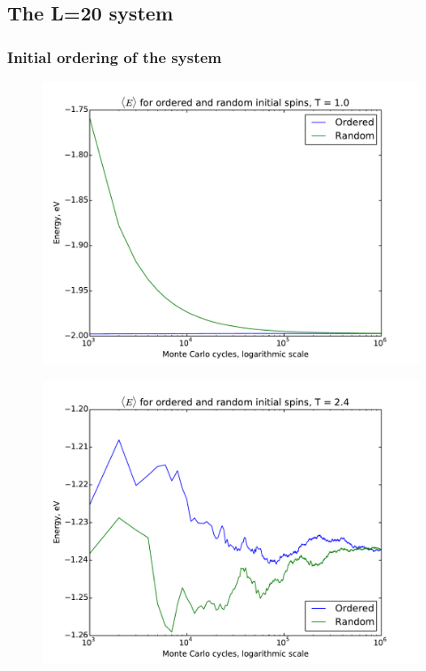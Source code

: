 \subsection{The L=20 system}

\subsubsection{Initial ordering of the system}

\begin{figure}[H]
	\centering
	\includegraphics[width=0.7\linewidth]{../results/4c/ran_order_T1}
	\caption{}
	\label{fig:ranordert1}
\end{figure}

\begin{figure}[H]
		\centering
	\includegraphics[width=0.7\linewidth]{../results/4c/ran_order_T2}
	\caption{}
	\label{fig:ranordert2}
\end{figure}



